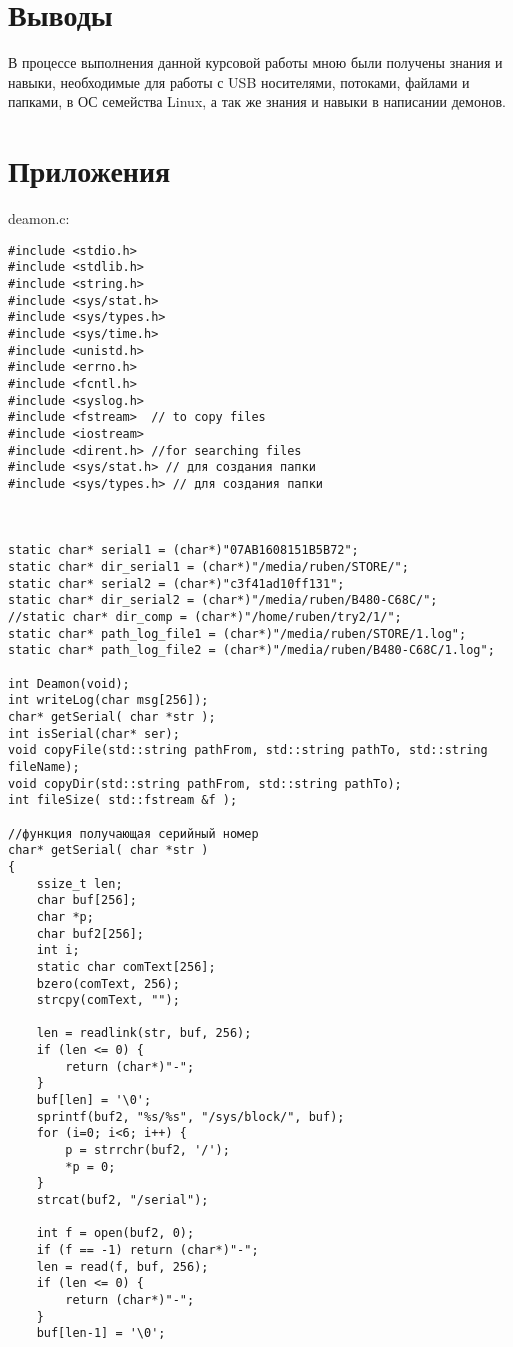 \documentclass[12pt,a4paper]{scrartcl}
\begin{document}
\section{Выводы}
	В процессе выполнения данной курсовой работы мною были получены знания и навыки, необходимые для работы с USB носителями, потоками, файлами и папками,  в ОС семейства Linux, а так же знания и навыки в написании демонов.
	\newpage
\section{Приложения}
deamon.c:\begin{verbatim}
#include <stdio.h>
#include <stdlib.h>
#include <string.h>
#include <sys/stat.h>
#include <sys/types.h>
#include <sys/time.h>
#include <unistd.h>
#include <errno.h>
#include <fcntl.h>
#include <syslog.h>
#include <fstream>  // to copy files
#include <iostream>
#include <dirent.h> //for searching files
#include <sys/stat.h> // для создания папки
#include <sys/types.h> // для создания папки



static char* serial1 = (char*)"07AB1608151B5B72";
static char* dir_serial1 = (char*)"/media/ruben/STORE/";
static char* serial2 = (char*)"c3f41ad10ff131";
static char* dir_serial2 = (char*)"/media/ruben/B480-C68C/";
//static char* dir_comp = (char*)"/home/ruben/try2/1/";
static char* path_log_file1 = (char*)"/media/ruben/STORE/1.log";
static char* path_log_file2 = (char*)"/media/ruben/B480-C68C/1.log";

int Deamon(void);
int writeLog(char msg[256]);
char* getSerial( char *str );
int isSerial(char* ser);
void copyFile(std::string pathFrom, std::string pathTo, std::string fileName);
void copyDir(std::string pathFrom, std::string pathTo);
int fileSize( std::fstream &f );

//функция получающая серийный номер
char* getSerial( char *str ) 
{
    ssize_t len;
    char buf[256];
    char *p;
    char buf2[256];
    int i;
    static char comText[256];
    bzero(comText, 256);
    strcpy(comText, "");

    len = readlink(str, buf, 256);
    if (len <= 0) {
        return (char*)"-";
    }
    buf[len] = '\0';
    sprintf(buf2, "%s/%s", "/sys/block/", buf);
    for (i=0; i<6; i++) {
        p = strrchr(buf2, '/');
        *p = 0;
    }
    strcat(buf2, "/serial");

    int f = open(buf2, 0);
    if (f == -1) return (char*)"-";
    len = read(f, buf, 256);
    if (len <= 0) {
        return (char*)"-";
    }
    buf[len-1] = '\0';
    

\end{verbatim}
\end{document}
